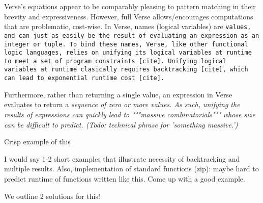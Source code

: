 \documentclass[manuscript,screen,review, 12pt]{acmart}
\begin{document}
\begin{outline}[enumerate]





    

    Verse's equations appear to be comparably pleasing to pattern matching
    in their brevity and expressiveness. However, full Verse allows/encourages
    computations that are problematic, cost-wise. In Verse, names (logical
    variables) are \tt{values}, and can just as easily be the result of
    evaluating an expression as an integer or tuple. To bind these names, Verse,
    like other functional logic languages, relies on unifying its logical
    variables at runtime to meet a set of program constraints [cite]. Unifying
    logical variables at runtime clasically requires backtracking [cite], which
    can lead to exponential runtime cost [cite]. 
        
    Furthermore, rather than returning a single value, an expression in Verse
    evaluates to return a \it{sequence} of zero or more values. As such,
    unifying the results of expressions can quickly lead to """massive
    combinatorials""" whose size can be difficult to predict. (Todo: technical phrase for 'something massive.') 


    \2 Crisp example of this 

    \3 I would say 1-2 short examples that illustrate necessity of backtracking  and multiple results. Also, implementation of standard functions (zip):  maybe hard to predict runtime of functions written like this. Come up with a good example. 

    \3 We outline 2 solutions for this! 

    \end{outline}
\end{document}
